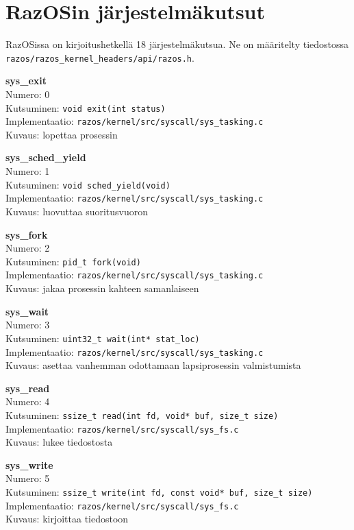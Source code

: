 \chapter{RazOSin järjestelmäkutsut}

\label{Syscalls}

RazOSissa on kirjoitushetkellä 18 järjestelmäkutsua. Ne on määritelty tiedostossa \texttt{razos/razos\_kernel\_headers/api/razos.h}.

\textbf{sys\_exit}\\
Numero: 0\\
Kutsuminen: \texttt{void exit(int status)}\\
Implementaatio: \texttt{razos/kernel/src/syscall/sys\_tasking.c}\\
Kuvaus: lopettaa prosessin

\textbf{sys\_sched\_yield}\\
Numero: 1\\
Kutsuminen: \texttt{void sched\_yield(void)}\\
Implementaatio: \texttt{razos/kernel/src/syscall/sys\_tasking.c}\\
Kuvaus: luovuttaa suoritusvuoron

\textbf{sys\_fork}\\
Numero: 2\\
Kutsuminen: \texttt{pid\_t fork(void)}\\
Implementaatio: \texttt{razos/kernel/src/syscall/sys\_tasking.c}\\
Kuvaus: jakaa prosessin kahteen samanlaiseen

\textbf{sys\_wait}\\
Numero: 3\\
Kutsuminen: \texttt{uint32\_t wait(int* stat\_loc)}\\
Implementaatio: \texttt{razos/kernel/src/syscall/sys\_tasking.c}\\
Kuvaus: asettaa vanhemman odottamaan lapsiprosessin valmistumista

\textbf{sys\_read}\\
Numero: 4\\
Kutsuminen: \texttt{ssize\_t read(int fd, void* buf, size\_t size)}\\
Implementaatio: \texttt{razos/kernel/src/syscall/sys\_fs.c}\\
Kuvaus: lukee tiedostosta

\textbf{sys\_write}\\
Numero: 5\\
Kutsuminen: \texttt{ssize\_t write(int fd, const void* buf, size\_t size)}\\
Implementaatio: \texttt{razos/kernel/src/syscall/sys\_fs.c}\\
Kuvaus: kirjoittaa tiedostoon

